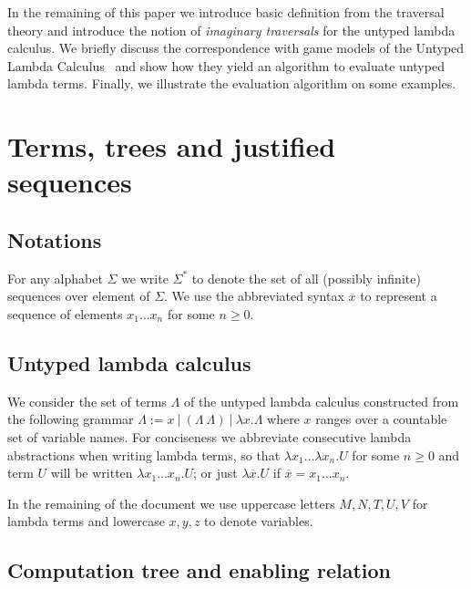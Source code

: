 \documentclass{elsarticle}
\theoremstyle{plain}
\theoremstyle{definition}
\theoremstyle{remark}
\begin{document}
In the remaining of this paper we introduce basic definition from the traversal theory and introduce the notion of \emph{imaginary traversals} for the untyped lambda calculus. We briefly discuss the correspondence with game models of the Untyped Lambda Calculus~\cite{KerThesis} and show how they yield an algorithm to evaluate untyped lambda terms. Finally, we illustrate the evaluation algorithm on some examples.

\section{Terms, trees and justified sequences}
\subsection{Notations}
For any alphabet $\Sigma$ we write $\Sigma^*$ to denote the set of all (possibly infinite) sequences over element of $\Sigma$.
 We use the abbreviated syntax $\overline{x}$ to represent a sequence of elements $x_1 \ldots x_n$ for some $n\geq0$.

\subsection{Untyped lambda calculus}
We consider the set of terms $\Lambda$ of the untyped lambda calculus constructed from the following grammar $\Lambda := x\ |\ (\Lambda\ \Lambda)\ |\ \lambda x. \Lambda $
where $x$ ranges over a countable set of variable names.
For conciseness we abbreviate consecutive lambda abstractions when writing lambda terms, so that $\lambda x_1 \ldots \lambda x_n . U$ for some $n\geq 0$ and term $U$ will be written $\lambda x_1 \ldots x_n . U$; or just
$\lambda \overline{x} . U$ if $\overline{x} = x_1 \ldots x_n$.

In the remaining of the document we use uppercase letters $M, N, T, U, V$ for lambda terms and lowercase $x,y,z$ to denote variables.

\subsection{Computation tree and enabling relation}
\end{document}
